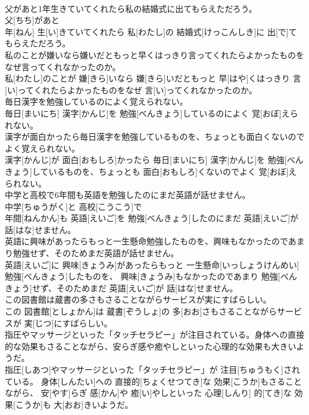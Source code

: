 \documentclass[8pt]{extreport}
\begin{document}
\begin{CJK}{UTF8}{min}
\\	父があと1年生きていてくれたら私の結婚式に出てもらえただろう。	
\\	父[ちち]があと 
\\	年[ねん] 生[い]きていてくれたら 私[わたし]の 結婚式[けっこんしき]に 出[で]てもらえただろう。
\\	私のことが嫌いなら嫌いだともっと早くはっきり言ってくれたらよかったものをなぜ言ってくれなかったのか。	
\\	私[わたし]のことが 嫌[きら]いなら 嫌[きら]いだともっと 早[はや]くはっきり 言[い]ってくれたらよかったものをなぜ 言[い]ってくれなかったのか。
\\	毎日漢字を勉強しているのによく覚えられない。	
\\	毎日[まいにち] 漢字[かんじ]を 勉強[べんきょう]しているのによく 覚[おぼ]えられない。
\\	漢字が面白かったら毎日漢字を勉強しているものを、ちょっとも面白くないのでよく覚えられない。	
\\	漢字[かんじ]が 面白[おもしろ]かったら 毎日[まいにち] 漢字[かんじ]を 勉強[べんきょう]しているものを、ちょっとも 面白[おもしろ]くないのでよく 覚[おぼ]えられない。
\\	中学と高校で6年間も英語を勉強したのにまだ英語が話せません。	
\\	中学[ちゅうがく]と 高校[こうこう]で 
\\	年間[ねんかん]も 英語[えいご]を 勉強[べんきょう]したのにまだ 英語[えいご]が 話[はな]せません。
\\	英語に興味があったらもっと一生懸命勉強したものを、興味もなかったのであまり勉強せず、そのためまだ英語が話せません。	
\\	英語[えいご]に 興味[きょうみ]があったらもっと 一生懸命[いっしょうけんめい] 勉強[べんきょう]したものを、 興味[きょうみ]もなかったのであまり 勉強[べんきょう]せず、そのためまだ 英語[えいご]が 話[はな]せません。
\\	この図書館は蔵書の多さもさることながらサービスが実にすばらしい。	
\\	この 図書館[としょかん]は 蔵書[ぞうしょ]の 多[おお]さもさることながらサービスが 実[じつ]にすばらしい。
\\	指圧やマッサージといった「タッチセラピー」が注目されている。身体への直接的な効果もさることながら、安らぎ感や癒やしといった心理的な効果も大きいようだ。	
\\	指圧[しあつ]やマッサージといった「タッチセラピー」が 注目[ちゅうもく]されている。 身体[しんたい]への 直接的[ちょくせつてき]な 効果[こうか]もさることながら、 安[やす]らぎ 感[かん]や 癒[い]やしといった 心理[しんり] 的[てき]な 効果[こうか]も 大[おお]きいようだ。

\end{CJK}
\end{document}
